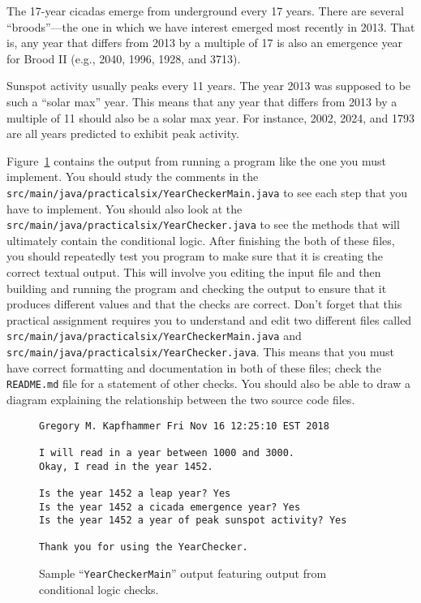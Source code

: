 \documentclass[11pt]{article}
\newcommand{\mainprogramsource}{\lstinline{src/main/java/practicalsix/YearCheckerMain.java}}
\newcommand{\secondprogramsource}{\lstinline{src/main/java/practicalsix/YearChecker.java}}
\begin{document}
\noindent The 17-year cicadas emerge from underground every 17 years. There are several ``broods''---the one in which we
have interest emerged most recently in 2013. That is, any year that differs from 2013 by a multiple of 17 is also an
emergence year for Brood II (e.g., 2040, 1996, 1928, and 3713).

\noindent Sunspot activity usually peaks every 11 years. The year 2013 was supposed to be such a ``solar max'' year.
This means that any year that differs from 2013 by a multiple of 11 should also be a solar max year. For instance, 2002,
2024, and 1793 are all years predicted to exhibit peak activity.

Figure~\ref{mad} contains the output from running a program like the one you must implement. You should study the
comments in the \mainprogramsource{} to see each step that you have to implement. You should also look at the
\secondprogramsource{} to see the methods that will ultimately contain the conditional logic. After finishing the both
of these files, you should repeatedly test you program to make sure that it is creating the correct textual output. This
will involve you editing the input file and then building and running the program and checking the output to ensure that
it produces different values and that the checks are correct. Don't forget that this practical assignment requires you
to understand and edit two different files called \mainprogramsource{} and \secondprogramsource{}. This means that you
must have correct formatting and documentation in both of these files; check the {\tt README.md} file for a statement of
other checks. You should also be able to draw a diagram explaining the relationship between the two source code files.

\begin{figure}[tb]
\begin{Verbatim}[commandchars=\\\{\}]
Gregory M. Kapfhammer Fri Nov 16 12:25:10 EST 2018

I will read in a year between 1000 and 3000.
Okay, I read in the year 1452.

Is the year 1452 a leap year? Yes
Is the year 1452 a cicada emergence year? Yes
Is the year 1452 a year of peak sunspot activity? Yes

Thank you for using the YearChecker.
\end{Verbatim}
\vspace*{-.1in}
\caption{Sample ``{\tt YearCheckerMain}'' output featuring output from conditional logic checks.}
\label{mad}
\end{figure}
\end{document}
